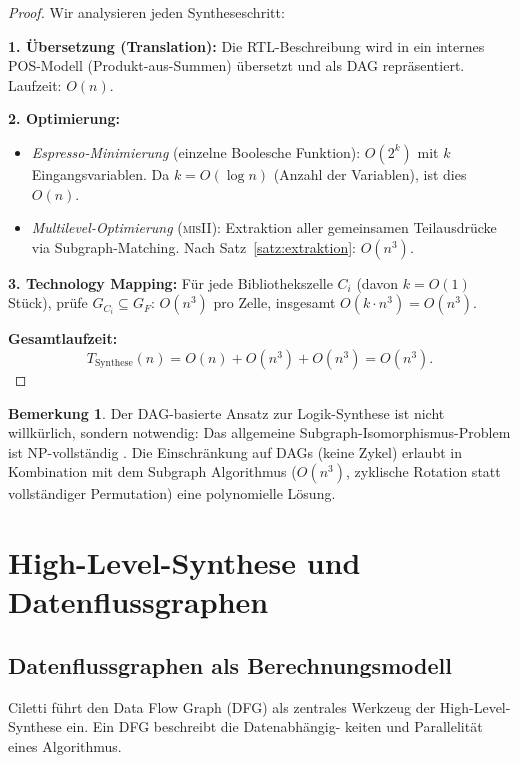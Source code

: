 ﻿\documentclass[a4paper,12pt]{article}
\theoremstyle{definition}
\newtheorem{bemerkung}{Bemerkung}
\begin{document}
\begin{proof}
  Wir analysieren jeden Syntheseschritt:

  \textbf{1. Übersetzung (Translation):} Die RTL-Beschreibung wird in ein internes
  POS-Modell (Produkt-aus-Summen) übersetzt und als DAG repräsentiert. Laufzeit: $O(n)$.

  \textbf{2. Optimierung:}
  \begin{itemize}
    \item \emph{Espresso-Minimierung} (einzelne Boolesche Funktion): $O(2^k)$ mit $k$
          Eingangsvariablen. Da $k = O(\log n)$ (Anzahl der Variablen), ist dies $O(n)$.
    \item \emph{Multilevel-Optimierung} (\textsc{misII}): Extraktion aller gemeinsamen
          Teilausdrücke via Subgraph-Matching. Nach Satz~\ref{satz:extraktion}: $O(n^3)$.
  \end{itemize}

  \textbf{3. Technology Mapping:}
  Für jede Bibliothekszelle $C_i$ (davon $k = O(1)$ Stück), prüfe $G_{C_i} \subseteq G_F$:
  $O(n^3)$ pro Zelle, insgesamt $O(k \cdot n^3) = O(n^3)$.

  \textbf{Gesamtlaufzeit:}
  \[
    T_{\text{Synthese}}(n) = O(n) + O(n^3) + O(n^3) = O(n^3).
  \]
\end{proof}

\begin{bemerkung}
  Der DAG-basierte Ansatz zur Logik-Synthese ist nicht willkürlich, sondern notwendig:
  Das allgemeine Subgraph-Isomorphismus-Problem ist NP-vollständig
  \cite{cook1971complexity}. Die Einschränkung auf DAGs (keine Zykel) erlaubt in
  Kombination mit dem Subgraph Algorithmus ($O(n^3)$, zyklische Rotation statt
  vollständiger Permutation) eine polynomielle Lösung.
\end{bemerkung}

\section{High-Level-Synthese und Datenflussgraphen}

\subsection{Datenflussgraphen als Berechnungsmodell}

Ciletti \cite[Kap.~9, S.~548--551]{ciletti2011} führt den Data Flow Graph (DFG) als
zentrales Werkzeug der High-Level-Synthese ein. Ein DFG beschreibt die Datenabhängig-
keiten und Parallelität eines Algorithmus.
\end{document}
